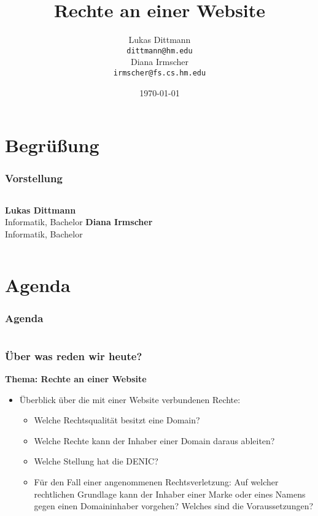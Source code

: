 \documentclass{beamer}
\title[Internet- und Medienrecht]{Rechte an einer Website}
\author[Lukas Dittmann \\und\\ Diana Irmscher]{Lukas Dittmann \\\texttt{dittmann@hm.edu}\\ Diana Irmscher\\\texttt{irmscher@fs.cs.hm.edu}}
\institute[Hochschule für angewandte Wissenschaften München]{Fakultät für Informatik und Mathematik}
\date{\today}
\begin{document}
	\maketitle
	
	\section{Begrüßung}
	
	\begin{frame}[t]
		\frametitle{Vorstellung}
		\begin{columns}
			
			\textbf{Lukas Dittmann}
			\\
			Informatik, Bachelor
			\textbf{Diana Irmscher}
			\\
			Informatik, Bachelor
		\end{columns}
	\end{frame}
	
	\section{Agenda}
	
	\begin{frame} %
		\frametitle{Agenda}
		\tableofcontents
	\end{frame}
	
	\section{}
	
	\begin{frame}
		\frametitle{Über was reden wir heute?}
		\textbf{Thema: Rechte an einer Website}
		\\
		\begin{itemize}
			\item Überblick über die mit einer Website verbundenen Rechte:
			\begin{itemize}
				\item Welche Rechtsqualität besitzt eine Domain?
				\item Welche Rechte kann der Inhaber einer Domain daraus ableiten?
				\item Welche Stellung hat die DENIC?
				\item Für den Fall einer angenommenen Rechtsverletzung: Auf welcher rechtlichen Grundlage kann der Inhaber einer Marke oder eines Namens gegen einen Domaininhaber vorgehen? Welches sind die Voraussetzungen?
			\end{itemize}
		\end{itemize}
	\end{frame}
	
\end{document}
